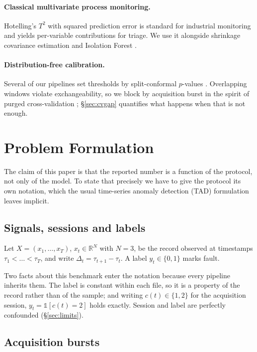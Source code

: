 \documentclass{article}
\begin{document}
\paragraph{Classical multivariate process monitoring.} Hotelling's $T^2$ with
squared prediction error is standard for industrial monitoring
\citep{jackson1979control,qin2003statistical} and yields per-variable
contributions for triage. We use it alongside shrinkage covariance estimation
\citep{ledoit2004well} and Isolation Forest \citep{liu2008isolation}.

\paragraph{Distribution-free calibration.} Several of our pipelines set
thresholds by split-conformal $p$-values
\citep{vovk2005algorithmic,angelopoulos2023conformal}. Overlapping windows
violate exchangeability, so we block by acquisition burst in the spirit of
purged cross-validation \citep{lopezdeprado2018advances}; \S\ref{sec:cvgap}
quantifies what happens when that is not enough.

\section{Problem Formulation}
\label{sec:prelim}

The claim of this paper is that the reported number is a function of the
protocol, not only of the model. To state that precisely we have to give the
protocol its own notation, which the usual time-series anomaly detection (TAD)
formulation leaves implicit.

\subsection{Signals, sessions and labels}

Let $X=(x_1,\dots,x_T)$, $x_t\in\mathbb{R}^{N}$ with $N=3$, be the record
observed at timestamps $\tau_1<\dots<\tau_T$, and write
$\Delta_t=\tau_{t+1}-\tau_t$. A label $y_t\in\{0,1\}$ marks fault.

Two facts about this benchmark enter the notation because every pipeline
inherits them. The label is constant within each file, so it is a property of
the record rather than of the sample; and writing $c(t)\in\{1,2\}$ for the
acquisition session, $y_t=\mathbb{1}[c(t)=2]$ holds exactly. Session and label
are perfectly confounded (\S\ref{sec:limits}).

\subsection{Acquisition bursts}
\end{document}
